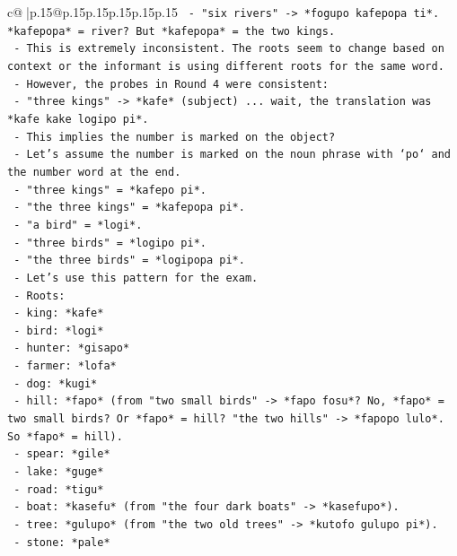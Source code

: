\documentclass{article}
\begin{document}
{\begin{supertabular}{c@{$\;$}|p{.15\linewidth}@{}p{.15\linewidth}p{.15\linewidth}p{.15\linewidth}p{.15\linewidth}p{.15\linewidth}}
{{{\texttt{    {-} "six rivers" {-}> *fogupo kafepopa ti*. *kafepopa* = river? But *kafepopa* = the two kings.} \\
\texttt{    {-} This is extremely inconsistent. The roots seem to change based on context or the informant is using different roots for the same word.} \\
\texttt{    {-} However, the probes in Round 4 were consistent:} \\
\texttt{      {-} "three kings" {-}> *kafe* (subject) ... wait, the translation was *kafe kake logipo pi*.} \\
\texttt{      {-} This implies the number is marked on the object?} \\
\texttt{      {-} Let's assume the number is marked on the noun phrase with `po` and the number word at the end.} \\
\texttt{      {-} "three kings" = *kafepo pi*.} \\
\texttt{      {-} "the three kings" = *kafepopa pi*.} \\
\texttt{      {-} "a bird" = *logi*.} \\
\texttt{      {-} "three birds" = *logipo pi*.} \\
\texttt{      {-} "the three birds" = *logipopa pi*.} \\
\texttt{    {-} Let's use this pattern for the exam.} \\
\texttt{    {-} Roots:} \\
\texttt{      {-} king: *kafe*} \\
\texttt{      {-} bird: *logi*} \\
\texttt{      {-} hunter: *gisapo*} \\
\texttt{      {-} farmer: *lofa*} \\
\texttt{      {-} dog: *kugi*} \\
\texttt{      {-} hill: *fapo* (from "two small birds" {-}> *fapo fosu*? No, *fapo* = two small birds? Or *fapo* = hill? "the two hills" {-}> *fapopo lulo*. So *fapo* = hill).} \\
\texttt{      {-} spear: *gile*} \\
\texttt{      {-} lake: *guge*} \\
\texttt{      {-} road: *tigu*} \\
\texttt{      {-} boat: *kasefu* (from "the four dark boats" {-}> *kasefupo*).} \\
\texttt{      {-} tree: *gulupo* (from "the two old trees" {-}> *kutofo gulupo pi*).} \\
\texttt{      {-} stone: *pale*} \\
}}}
\end{supertabular}}
\end{document}
